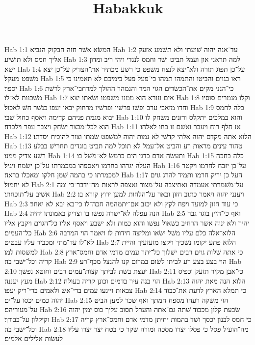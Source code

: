 

\title{Habakkuk}

Hab 1:1  המשׂא אשׁר חזה חבקוק הנביא׃
Hab 1:2  עד־אנה יהוה שׁועתי ולא תשׁמע אזעק אליך חמס ולא תושׁיע׃
Hab 1:3  למה תראני און ועמל תביט ושׁד וחמס לנגדי ויהי ריב ומדון ישׂא׃
Hab 1:4  על־כן תפוג תורה ולא־יצא לנצח משׁפט כי רשׁע מכתיר את־הצדיק על־כן יצא משׁפט מעקל׃
Hab 1:5  ראו בגוים והביטו והתמהו תמהו כי־פעל פעל בימיכם לא תאמינו כי יספר׃
Hab 1:6  כי־הנני מקים את־הכשׂדים הגוי המר והנמהר ההולך למרחבי־ארץ לרשׁת משׁכנות לא־לו׃
Hab 1:7  אים ונורא הוא ממנו משׁפטו ושׂאתו יצא׃
Hab 1:8  וקלו מנמרים סוסיו וחדו מזאבי ערב ופשׁו פרשׁיו ופרשׁיו מרחוק יבאו יעפו כנשׁר חשׁ לאכול׃
Hab 1:9  כלה לחמס יבוא מגמת פניהם קדימה ויאסף כחול שׁבי׃
Hab 1:10  והוא במלכים יתקלס ורזנים משׂחק לו הוא לכל־מבצר ישׂחק ויצבר עפר וילכדה׃
Hab 1:11  אז חלף רוח ויעבר ואשׁם זו כחו לאלהו׃
Hab 1:12  הלוא אתה מקדם יהוה אלהי קדשׁי לא נמות יהוה למשׁפט שׂמתו וצור להוכיח יסדתו׃
Hab 1:13  טהור עינים מראות רע והביט אל־עמל לא תוכל למה תביט בוגדים תחרישׁ בבלע רשׁע צדיק ממנו׃
Hab 1:14  ותעשׂה אדם כדגי הים כרמשׂ לא־משׁל בו׃
Hab 1:15  כלה בחכה העלה יגרהו בחרמו ויאספהו במכמרתו על־כן ישׂמח ויגיל׃
Hab 1:16  על־כן יזבח לחרמו ויקטר למכמרתו כי בהמה שׁמן חלקו ומאכלו בראה׃
Hab 1:17  העל כן יריק חרמו ותמיד להרג גוים לא יחמול׃
Hab 2:1  על־משׁמרתי אעמדה ואתיצבה על־מצור ואצפה לראות מה־ידבר־בי ומה אשׁיב על־תוכחתי׃
Hab 2:2  ויענני יהוה ויאמר כתוב חזון ובאר על־הלחות למען ירוץ קורא בו׃
Hab 2:3  כי עוד חזון למועד ויפח לקץ ולא יכזב אם־יתמהמה חכה־לו כי־בא יבא לא יאחר׃
Hab 2:4  הנה עפלה לא־ישׁרה נפשׁו בו וצדיק באמונתו יחיה׃
Hab 2:5  ואף כי־היין בוגד גבר יהיר ולא ינוה אשׁר הרחיב כשׁאול נפשׁו והוא כמות ולא ישׂבע ויאסף אליו כל־הגוים ויקבץ אליו כל־העמים׃
Hab 2:6  הלוא־אלה כלם עליו משׁל ישׂאו ומליצה חידות לו ויאמר הוי המרבה לא־לו עד־מתי ומכביד עליו עבטיט׃
Hab 2:7  הלוא פתע יקומו נשׁכיך ויקצו מזעזעיך והיית למשׁסות למו׃
Hab 2:8  כי אתה שׁלות גוים רבים ישׁלוך כל־יתר עמים מדמי אדם וחמס־ארץ קריה וכל־ישׁבי בה׃
Hab 2:9  הוי בצע בצע רע לביתו לשׂום במרום קנו להנצל מכף־רע׃
Hab 2:10  יעצת בשׁת לביתך קצות־עמים רבים וחוטא נפשׁך׃
Hab 2:11  כי־אבן מקיר תזעק וכפיס מעץ יעננה׃
Hab 2:12  הוי בנה עיר בדמים וכונן קריה בעולה׃
Hab 2:13  הלוא הנה מאת יהוה צבאות וייגעו עמים בדי־אשׁ ולאמים בדי־ריק יעפו׃
Hab 2:14  כי תמלא הארץ לדעת את־כבוד יהוה כמים יכסו על־ים׃
Hab 2:15  הוי משׁקה רעהו מספח חמתך ואף שׁכר למען הביט על־מעוריהם׃
Hab 2:16  שׂבעת קלון מכבוד שׁתה גם־אתה והערל תסוב עליך כוס ימין יהוה וקיקלון על־כבודך׃
Hab 2:17  כי חמס לבנון יכסך ושׁד בהמות יחיתן מדמי אדם וחמס־ארץ קריה וכל־ישׁבי בה׃
Hab 2:18  מה־הועיל פסל כי פסלו יצרו מסכה ומורה שׁקר כי בטח יצר יצרו עליו לעשׂות אלילים אלמים׃
